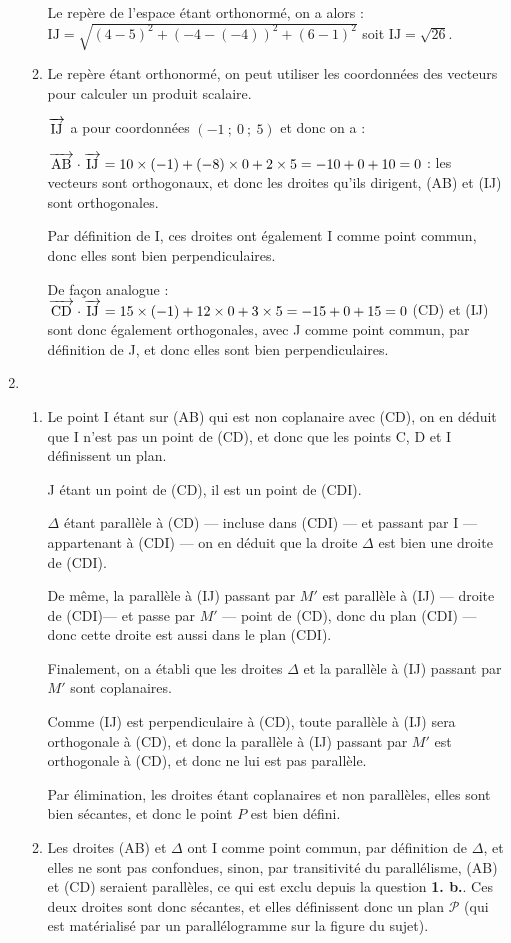 \documentclass[10pt]{article}
\newcommand{\vect}[1]{\overrightarrow{\,\mathstrut#1\,}}
\begin{document}
\begin{enumerate}
\begin{enumerate}
Le repère de l'espace étant orthonormé, on a alors : $\text{IJ} = \sqrt{(4 - 5)^2 + (-4 - (-4))^2 + (6 - 1)^2}$ soit $\text{IJ} = \sqrt{26}$.
		
		\item Le repère étant orthonormé, on peut utiliser les coordonnées des vecteurs pour calculer un produit scalaire.
		
$ \vect{\text{IJ}} $ a pour coordonnées $(-1~;~0~;~5)$ et donc on a :
		
$\vect{\text{AB}} \cdot  \vect{\text{IJ}} = 10 \times (-1) + (-8) \times 0 + 2 \times 5 = -10 + 0 + 10 = 0$ : les vecteurs sont orthogonaux, et donc les droites qu'ils dirigent, (AB) et (IJ) sont orthogonales.
		
Par définition de I, ces droites ont également I comme point commun, donc elles sont bien perpendiculaires.
		
De façon analogue : $\vect{\text{CD}} \cdot  \vect{\text{IJ}} = 15 \times (-1) + 12 \times 0 + 3 \times 5 = -15 + 0 + 15 = 0$ (CD) et (IJ) sont donc également orthogonales, avec J comme point commun, par définition de J, et donc elles sont bien perpendiculaires.
	\end{enumerate}
	
	\item \begin{enumerate}
		\item Le point I étant sur (AB) qui est non coplanaire avec (CD), on en déduit que I n'est pas un point de (CD), et donc que les points C, D et I définissent un plan.
		
J étant un point de (CD), il est un point de (CDI).
		
$\Delta$ étant parallèle à (CD) --- incluse dans (CDI) --- et passant par I --- appartenant à (CDI) --- on en déduit que la droite $\Delta$ est bien une droite de (CDI).
		
De même, la parallèle à (IJ) passant par $M'$ est parallèle à (IJ) --- droite de (CDI)--- et passe par $M'$ --- point de (CD), donc du plan (CDI) ---  donc cette droite est aussi dans le plan (CDI).
		
Finalement, on a établi que les droites $\Delta$ et la parallèle à (IJ) passant par $M'$ sont coplanaires.
		
Comme (IJ) est perpendiculaire à (CD), toute parallèle à (IJ) sera orthogonale à (CD), et donc la parallèle à (IJ) passant par $M'$ est orthogonale à (CD), et donc ne lui est pas parallèle.
		
Par élimination, les droites étant coplanaires et non parallèles, elles sont bien sécantes, et donc le point $P$ est bien défini.
		\item Les droites (AB) et $\Delta$ ont I comme point commun, par définition de $\Delta$, et elles ne sont pas confondues, sinon, par transitivité du parallélisme, (AB) et (CD) seraient parallèles, ce qui est exclu depuis la question \textbf{1. b.}. Ces deux droites sont donc sécantes, et elles définissent donc un plan $\mathcal{P}$ (qui est matérialisé par un parallélogramme sur la figure du sujet).
		

\end{enumerate}
\end{enumerate}
\end{document}
